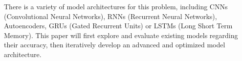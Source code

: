 \documentclass[11pt,table]{article}
\begin{document}
There is a variety of model architectures for this problem, including CNNs (Convolutional Neural Networks), RNNs (Recurrent Neural Networks), Autoencoders, GRUs (Gated Recurrent Units) or LSTMs (Long Short Term Memory). This paper will first explore and evaluate existing models regarding their accuracy, then iteratively develop an advanced and optimized model architecture.\\







\end{document}
